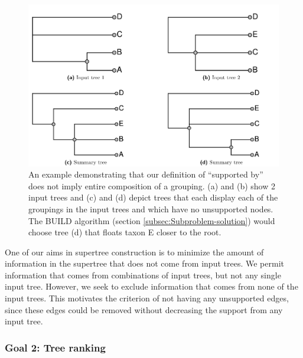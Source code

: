 \documentclass[fleqn,12pt,lineno,english]{wlpeerj}
\begin{document}
\begin{figure}
\includegraphics[width=1.0\textwidth]{Fig1}  

\caption{An example demonstrating that our definition of ``supported by''
does not imply entire composition of a grouping. (a) and (b) show
2 input trees and (c) and (d) depict trees that each display each
of the groupings in the input trees and which have no unsupported
nodes. The BUILD algorithm (section \ref{subsec:Subproblem-solution})
would choose tree (d) that floats taxon E closer to the root.}

\label{fig:toyambig}
\end{figure}

One of our aims in supertree construction is to minimize the amount
of information in the supertree that does not come from input trees.
We permit information that comes from combinations of input trees,
but not any single input tree. However, we seek to exclude information
that comes from none of the input trees. This motivates the criterion
of not having any unsupported edges, since these edges could be removed
without decreasing the support from any input tree.

\subsubsection{Goal 2: Tree ranking}
\end{document}

